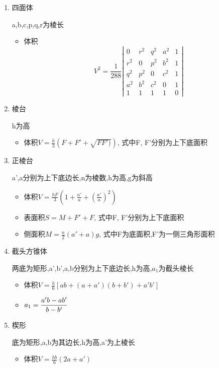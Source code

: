 \begin{enumerate}
	\item 四面体
	
	a,b,c,p,q,r为棱长
	\begin{itemize}
		\item 体积$$V^2 = \frac{1}{288}\left|
		\begin{matrix}
		0   & r^2 & q^2 & a^2 & 1\\
		r^2 & 0   & p^2 & b^2 & 1\\
		q^2 & p^2 & 0   & c^2 & 1\\
		a^2 & b^2 & c^2 & 0   & 1\\
		1   & 1   & 1   & 1   & 0
		\end{matrix}
		\right|$$
	\end{itemize}
	
	\item 棱台
	
	h为高
	\begin{itemize}
		\item 体积$\displaystyle V = \frac{h}{3}(F + F' + \sqrt{F F')})$, 式中F, F'分别为上下底面积
	\end{itemize}
	
	\item 正棱台
	
	a’,a分别为上下底边长,n为棱数,h为高,g为斜高
	\begin{itemize}
		\item 体积$\displaystyle V = \frac{hF}{3} (1 + \frac{a'}{a} + (\frac{a'}{a})^2 )$
		\item 表面积$S = M + F' + F$, 式中F, F'分别为上下底面积
		\item 侧面积$M = \frac{n}{2}(a' + a)g$, 式中F为底面积,F'为一侧三角形面积
	\end{itemize}
	
	\item 截头方锥体
	
	两底为矩形,a’,b’,a,b分别为上下底边长,h为高,$a_1$为截头棱长
	\begin{itemize}
		\item 体积$\displaystyle V = \frac{h}{6} [ab + (a + a')(b + b') + a'b']$
		\item $\displaystyle a_1 = \frac{a'b - ab'}{b - b'}$
	\end{itemize}
	
	\item 楔形
	
	底为矩形,a,b为其边长,h为高,a’为上棱长
	\begin{itemize}
		\item 体积$\displaystyle V = \frac{hb}{6} (2a + a')$
	\end{itemize}
	

\end{enumerate}
